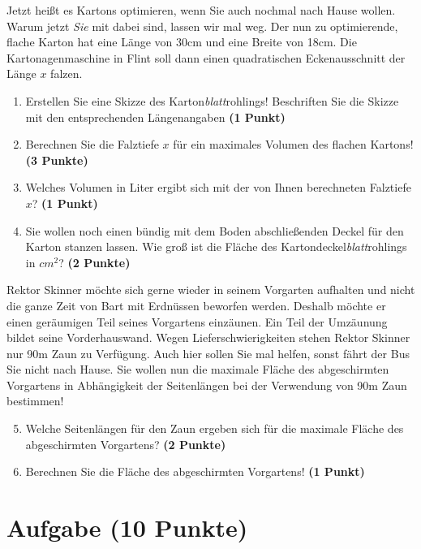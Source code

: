 \documentclass[a4paper, 9pt]{scrartcl}\usepackage[]{graphicx}\usepackage[]{xcolor}
\begin{document}
Jetzt heißt es Kartons optimieren, wenn Sie auch nochmal nach Hause wollen. Warum jetzt \textit{Sie} mit dabei sind, lassen wir mal weg. Der nun zu optimierende, flache Karton hat eine Länge von 30cm und eine Breite von 18cm. Die Kartonagenmaschine in Flint soll dann einen quadratischen Eckenausschnitt der Länge $x$ falzen.

\begin{enumerate}
\item Erstellen Sie eine Skizze des Karton\textit{blatt}rohlings! Beschriften Sie die Skizze mit den entsprechenden Längenangaben \textbf{(1 Punkt)}
\item Berechnen Sie die Falztiefe $x$ für ein maximales Volumen des flachen Kartons! \textbf{(3 Punkte)}
\item Welches Volumen in Liter ergibt sich mit der von Ihnen berechneten Falztiefe $x$?  \textbf{(1 Punkt)}
\item Sie wollen noch einen bündig mit dem Boden abschließenden Deckel für den Karton stanzen lassen. Wie groß ist die Fläche des Kartondeckel\textit{blatt}rohlings in $cm^2$? \textbf{(2 Punkte)}
\end{enumerate}

Rektor Skinner möchte sich gerne wieder in seinem Vorgarten aufhalten und nicht die ganze Zeit von Bart mit Erdnüssen beworfen werden. Deshalb möchte er einen geräumigen Teil seines Vorgartens einzäunen. Ein Teil der Umzäunung bildet seine Vorderhauswand. Wegen Lieferschwierigkeiten stehen Rektor Skinner nur 90m Zaun zu Verfügung. Auch hier sollen Sie mal helfen, sonst fährt der Bus Sie nicht nach Hause. Sie wollen nun die maximale Fläche des abgeschirmten Vorgartens in Abhängigkeit der Seitenlängen bei der Verwendung von 90m Zaun bestimmen!

\begin{enumerate}
  \setcounter{enumi}{4}  
\item  Welche Seitenlängen für den Zaun ergeben sich für die maximale Fläche des abgeschirmten Vorgartens? \textbf{(2 Punkte)}
\item Berechnen Sie die Fläche des abgeschirmten Vorgartens! \textbf{(1 Punkt)}
\end{enumerate}

 
\clearpage

\section{Aufgabe \hfill (10 Punkte)}
\end{document}
